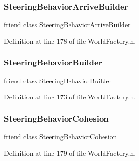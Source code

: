 \subsubsection{\texorpdfstring{Steering\+Behavior\+Arrive\+Builder}{SteeringBehaviorArriveBuilder}}
{\footnotesize\ttfamily friend class \mbox{\hyperlink{classnjli_1_1_steering_behavior_arrive_builder}{Steering\+Behavior\+Arrive\+Builder}}\hspace{0.3cm}{\ttfamily [friend]}}



Definition at line 178 of file World\+Factory.\+h.

\mbox{\label{classnjli_1_1_world_factory_a331a672189b9f56521adf39cc0817dda}} 
\subsubsection{\texorpdfstring{Steering\+Behavior\+Builder}{SteeringBehaviorBuilder}}
{\footnotesize\ttfamily friend class \mbox{\hyperlink{classnjli_1_1_steering_behavior_builder}{Steering\+Behavior\+Builder}}\hspace{0.3cm}{\ttfamily [friend]}}



Definition at line 173 of file World\+Factory.\+h.

\mbox{\label{classnjli_1_1_world_factory_af0dc08bdc007e78d18eb2917a1156f36}} 
\subsubsection{\texorpdfstring{Steering\+Behavior\+Cohesion}{SteeringBehaviorCohesion}}
{\footnotesize\ttfamily friend class \mbox{\hyperlink{classnjli_1_1_steering_behavior_cohesion}{Steering\+Behavior\+Cohesion}}\hspace{0.3cm}{\ttfamily [friend]}}



Definition at line 179 of file World\+Factory.\+h.

